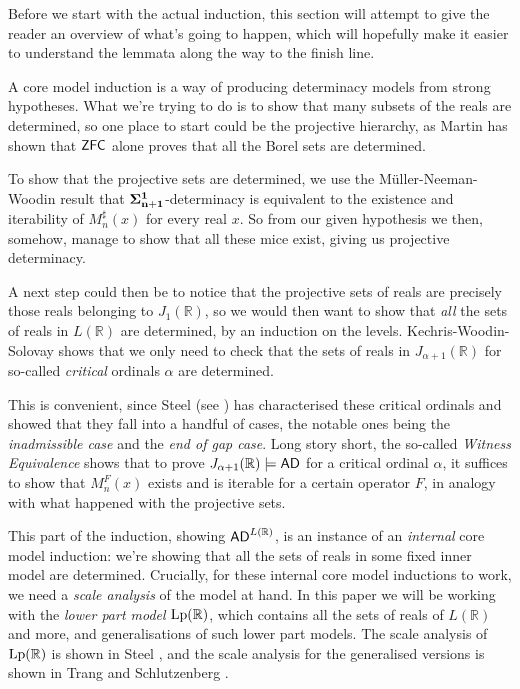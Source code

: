 \documentclass[../../main]{subfiles}
\begin{document}
Before we start with the actual induction, this section will attempt to give the reader an overview of what's going to happen, which will hopefully make it easier to understand the lemmata along the way to the finish line.

\qquad A core model induction is a way of producing determinacy models from strong hypotheses. What we're trying to do is to show that many subsets of the reals are determined, so one place to start could be the projective hierarchy, as Martin has shown that $\textsf{ZFC}$ alone proves that all the Borel sets are determined.

\qquad To show that the projective sets are determined, we use the M\" uller-Neeman-Woodin result that $\bf\Sigma^1_{n+1}$-determinacy is equivalent to the existence and iterability of $M_n^\sharp(x)$ for every real $x$. So from our given hypothesis we then, somehow, manage to show that all these mice exist, giving us projective determinacy.

\qquad A next step could then be to notice that the projective sets of reals are precisely those reals belonging to $J_1(\mathbb R)$, so we would then want to show that \textit{all} the sets of reals in $L(\mathbb R)$ are determined, by an induction on the levels. Kechris-Woodin-Solovay  shows that we only need to check that the sets of reals in $J_{\alpha+1}(\mathbb R)$ for so-called \textit{critical} ordinals $\alpha$ are determined.

\qquad This is convenient, since Steel (see \cite{scalesinL(R)}) has characterised these critical ordinals and showed that they fall into a handful of cases, the notable ones being the \textit{inadmissible case} and the \textit{end of gap case}. Long story short, the so-called \textit{Witness Equivalence} shows that to prove $J_{\alpha+1}(\mathbb R)\models\textsf{AD}$ for a critical ordinal $\alpha$, it suffices to show that $M_n^F(x)$ exists and is iterable for a certain operator $F$, in analogy with what happened with the projective sets.

\qquad This part of the induction, showing $\textsf{AD}^{L{(\mathbb R)}}$, is an instance of an \textit{internal} core model induction: we're showing that all the sets of reals in some fixed inner model are determined. Crucially, for these internal core model inductions to work, we need a \textit{scale analysis} of the model at hand. In this paper we will be working with the \textit{lower part model} $\operatorname{Lp}(\mathbb R)$, which contains all the sets of reals of $L(\mathbb R)$ and more, and generalisations of such lower part models. The scale analysis of $\operatorname{Lp}(\mathbb R)$ is shown in Steel , and the scale analysis for the generalised versions is shown in Trang and Schlutzenberg .
\end{document}
